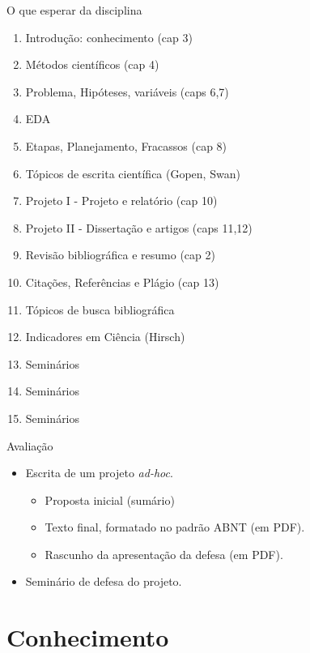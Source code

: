 \documentclass{beamer}
\begin{document}
\begin{frame}{O que esperar da disciplina}
  \begin{enumerate}
  \item<2,7> {Introdução: conhecimento} (cap 3)
  \item<2,7> {Métodos científicos} (cap 4)
  \item<3,7> {Problema, Hipóteses, variáveis} (caps 6,7)
  \item<3,7> {EDA}
  \item<3,7> {Etapas, Planejamento, Fracassos} (cap 8)
  \item<4,7> \alert<7>{Tópicos de escrita científica} (Gopen, Swan)
  \item<5,7> {Projeto I - Projeto e relatório} (cap 10)
  \item<5,7> {Projeto II - Dissertação e artigos} (caps 11,12)
  \item<5,7> {Revisão bibliográfica e resumo} (cap 2)
  \item<5,7> {Citações, Referências e Plágio} (cap 13)
  \item<6,7> {Tópicos de busca bibliográfica}
  \item<6,7> \alert<7>{Indicadores em Ciência} (Hirsch)
  \item<1-> Seminários
  \item<1-> Seminários
  \item<1-> Seminários
  \end{enumerate}
\end{frame}

\begin{frame}{Avaliação}
  \begin{itemize}
  \item Escrita de um projeto {\em ad-hoc}.
    \begin{itemize}
    \item<2-> Proposta inicial (sumário)
    \item<3-> Texto final, formatado no padrão ABNT (em PDF).
    \item<3-> Rascunho da apresentação da defesa (em PDF).
    \end{itemize}
  \item<3-> Seminário de defesa do projeto.
  \end{itemize}
\end{frame}

\section{Conhecimento}
\end{document}
